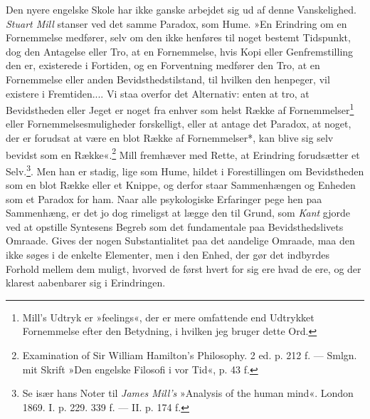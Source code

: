 \documentclass[12pt,a4paper,openany]{book}
\newcommand{\opage}[1]{\marginnote{\footnotesize\textit{[#1]}}}
\begin{document}
Den nyere engelske Skole har ikke ganske arbejdet sig ud af denne
Vanskelighed. \emph{Stuart Mill} stanser ved det samme Paradox, som
Hume. »En Erindring om en Fornemmelse medfører, selv om den ikke
henføres til noget bestemt Tidspunkt, dog den Antagelse eller Tro, at en
Fornemmelse, hvis Kopi eller Genfremstilling den er, existerede i
Fortiden, og en Forventning medfører den Tro, at en Fornemmelse eller
anden Bevidsthedstilstand, til hvilken den henpeger, vil existere i
Fremtiden.... Vi staa overfor det Alternativ: enten at tro, at
Bevidstheden eller Jeget er noget fra enhver som helst Række af
Fornemmelser\footnote[1]{Mill’s Udtryk er »feelings«, der er mere
omfattende end Udtrykket Fornemmelse efter den Betydning, i hvilken jeg
bruger dette Ord.} eller Fornemmelsesmuligheder forskelligt, eller at
antage det Paradox, at noget, der er forudsat at være en blot Række af
Fornemmelser*, kan blive sig selv
\opage{168}bevidst som en Række«.\footnote[1]{Examination of Sir William
Hamilton’s Philosophy. 2 ed. p. 212 f. --- Smlgn. mit Skrift »Den
engelske Filosofi i vor Tid«, p. 43 f.} Mill fremhæver med Rette, at
Erindring forudsætter et Selv.\footnote[2]{Se især hans Noter til
\emph{James Mill’s} »Analysis of the human mind«. London 1869. I. p.
229. 339 f. --- II. p. 174 f.}. Men han er stadig, lige som Hume, hildet
i Forestillingen om Bevidstheden som en blot Række eller et Knippe, og
derfor staar Sammenhængen og Enheden som et Paradox for ham. Naar alle
psykologiske Erfaringer pege hen paa Sammenhæng, er det jo dog rimeligst
at lægge den til Grund, som \emph{Kant} gjorde ved at opstille Syntesens
Begreb som det fundamentale paa Bevidsthedslivets Omraade. Gives der
nogen Substantialitet paa det aandelige Omraade, maa den ikke søges i de
enkelte Elementer, men i den Enhed, der gør det indbyrdes Forhold mellem
dem muligt, hvorved de først hvert for sig ere hvad de ere, og der
klarest aabenbarer sig i Erindringen.
\end{document}
